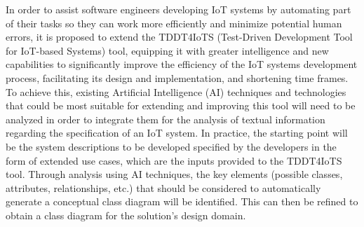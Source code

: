 
In order to assist software engineers developing IoT systems by automating part of their tasks so they can work more efficiently and minimize potential human errors, it is proposed to extend the TDDT4IoTS (Test-Driven Development Tool for IoT-based Systems) tool, equipping it with greater intelligence and new capabilities to significantly improve the efficiency of the IoT systems development process, facilitating its design and implementation, and shortening time frames. To achieve this, existing Artificial Intelligence (AI) techniques and technologies that could be most suitable for extending and improving this tool will need to be analyzed in order to integrate them for the analysis of textual information regarding the specification of an IoT system. In practice, the starting point will be the system descriptions to be developed specified by the developers in the form of extended use cases, which are the inputs provided to the TDDT4IoTS tool. Through analysis using AI techniques, the key elements (possible classes, attributes, relationships, etc.) that should be considered to automatically generate a conceptual class diagram will be identified. This can then be refined to obtain a class diagram for the solution's design domain.
